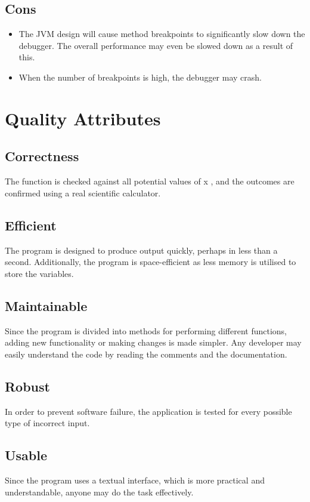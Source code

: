 \documentclass{article}
\begin{document}
    \subsection{Cons}
    \begin{itemize}
        \item The JVM design will cause method breakpoints to significantly slow down the debugger. The overall performance may even be slowed down as a result of this.
        \item When the number of breakpoints is high, the debugger may crash.
    \end{itemize}


    \section{Quality Attributes}

    \subsection{Correctness}
    The function is checked against all potential values of x , and the outcomes are confirmed using a real scientific calculator.

    \subsection{Efficient}
    The program is designed to produce output quickly, perhaps in less than a second. Additionally, the program is space-efficient as less memory is utilised to store the variables.

    \subsection{Maintainable}
    Since the program is divided into methods for performing different functions, adding new functionality or making changes is made simpler. Any developer may easily understand the code by reading the comments and the documentation.

    \subsection{Robust}
    In order to prevent software failure, the application is tested for every possible type of incorrect input.

    \subsection{Usable}
    Since the program uses a textual interface, which is more practical and understandable, anyone may do the task effectively.
\end{document}
